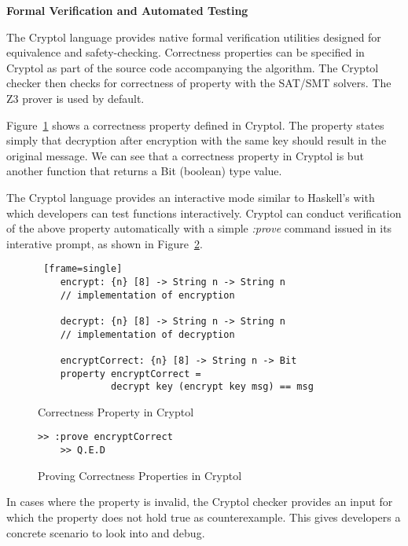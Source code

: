 \documentclass[a4paper, notitlepage]{report}
\renewcommand{\paragraph}[1]{\vspace*{1em}\noindent\textbf{#1}\hspace*{1em}}
\begin{document}
\paragraph{Formal Verification and Automated Testing}

The Cryptol language provides native formal verification utilities designed for
equivalence and safety-checking. Correctness properties can be specified in Cryptol
as part of the source code accompanying the algorithm. The Cryptol checker then
checks for correctness of property with the SAT/SMT solvers. The Z3 prover is used
by default.

Figure~\ref{fig:property} shows a correctness property defined in Cryptol. The
property states simply that decryption after encryption with the same key should
result in the original message. We can see that a correctness property in Cryptol
is but another function that returns a Bit (boolean) type value.

The Cryptol language provides an interactive mode similar to Haskell's with which
developers can test functions interactively.
Cryptol can conduct verification of the above property automatically with a simple
\emph{:prove} command issued in its interative prompt, as shown in Figure~\ref{fig:prove}.

\begin{figure}
  \begin{lstlisting} [frame=single]
    encrypt: {n} [8] -> String n -> String n
    // implementation of encryption
    
    decrypt: {n} [8] -> String n -> String n
    // implementation of decryption

    encryptCorrect: {n} [8] -> String n -> Bit
    property encryptCorrect =
             decrypt key (encrypt key msg) == msg 
  \end{lstlisting}
  
  \caption{Correctness Property in Cryptol}
  \label{fig:property}
\end{figure}

\begin{figure}
  \begin{lstlisting}[frame=single]
    >> :prove encryptCorrect
    >> Q.E.D
  \end{lstlisting}
  \caption{Proving Correctness Properties in Cryptol}
  \label{fig:prove}
\end{figure}

In cases where the property is invalid, the Cryptol checker provides an input
for which the property does not hold true as counterexample. This gives developers
a concrete scenario to look into and debug.
\end{document}
